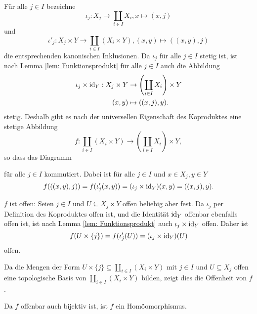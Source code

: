 \documentclass[a4paper,10pt]{article}
\begin{document}
Für alle $j \in I$ bezeichne
\[
 \iota_j: X_j \to \coprod_{i \in I} X_i, x \mapsto (x,j)
\]
und
\[
 \iota'_j : X_j \times Y \to \coprod_{i \in I}(X_i \times Y), (x,y) \mapsto ((x,y),j)
\]
die entsprechenden kanonischen Inklusionen. Da $\iota_j$ für alle $j \in I$ stetig ist, ist nach Lemma \ref{lem: Funktionsprodukt} für alle $j \in I$ auch die Abbildung
\begin{align*}
 \iota_j \times \operatorname{id}_Y:
 X_j \times Y &\to \left(\coprod_{i \in I} X_i\right) \times Y \\
 (x,y) &\mapsto ((x,j),y).
\end{align*}
stetig. Deshalb gibt es nach der universellen Eigenschaft des Koproduktes eine stetige Abbildung
\[
 f: \coprod_{i \in I} \left( X_i \times Y \right) \to \left( \coprod_{i \in I} X_i \right) \times Y,
\]
so dass das Diagramm
\begin{center}
\end{center}
für alle $j \in I$ kommutiert. Dabei ist für alle $j \in I$ und $x \in X_j, y \in Y$
\[
 f( ((x,y),j) )
 = f( \iota_j'(x,y) )
 = (\iota_j \times \operatorname{id}_Y)(x,y)
 = ((x,j),y).
\]

$f$ ist offen: Seien $j \in I$ und $U \subseteq X_j \times Y$ offen beliebig aber fest. Da $\iota_j$ per Definition des Koproduktes offen ist, und die Identität $\operatorname{id}_Y$ offenbar ebenfalls offen ist, ist nach Lemma \ref{lem: Funktionsprodukt} auch $\iota_j \times \operatorname{id}_Y$ offen. Daher ist
\[
 f(U \times \{j\})
 = f(\iota_j'(U))
 = (\iota_j \times \operatorname{id}_Y)(U)
\]
offen.

Da die Mengen der Form $U \times \{j\} \subseteq \coprod_{i \in I} (X_i \times Y)$ mit $j \in I$ und $U \subseteq X_j$ offen eine topologische Basis von $\coprod_{i \in I}(X_i \times Y)$ bilden, zeigt dies die Offenheit von $f$.

Da $f$ offenbar auch bijektiv ist, ist $f$ ein Homöomorphismus.
\end{document}
